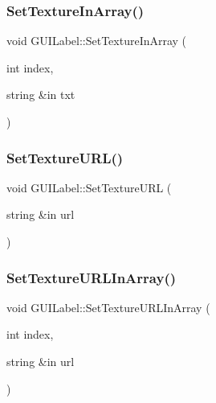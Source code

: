 \hypertarget{class_g_u_i_label_a912bd573d07f939e5a40ef0b094566be}{}\label{class_g_u_i_label_a912bd573d07f939e5a40ef0b094566be} 
\subsubsection{\texorpdfstring{Set\+Texture\+In\+Array()}{SetTextureInArray()}}
{\footnotesize\ttfamily void G\+U\+I\+Label\+::\+Set\+Texture\+In\+Array (\begin{DoxyParamCaption}\item[{int}]{index,  }\item[{string \&in}]{txt }\end{DoxyParamCaption})}

\hypertarget{class_g_u_i_label_a0ab6d355c6e465f80299d08edf98da87}{}\label{class_g_u_i_label_a0ab6d355c6e465f80299d08edf98da87} 
\subsubsection{\texorpdfstring{Set\+Texture\+U\+R\+L()}{SetTextureURL()}}
{\footnotesize\ttfamily void G\+U\+I\+Label\+::\+Set\+Texture\+U\+RL (\begin{DoxyParamCaption}\item[{string \&in}]{url }\end{DoxyParamCaption})}

\hypertarget{class_g_u_i_label_ae216a9d23cc634bdf0eed7736f26f6d2}{}\label{class_g_u_i_label_ae216a9d23cc634bdf0eed7736f26f6d2} 
\subsubsection{\texorpdfstring{Set\+Texture\+U\+R\+L\+In\+Array()}{SetTextureURLInArray()}}
{\footnotesize\ttfamily void G\+U\+I\+Label\+::\+Set\+Texture\+U\+R\+L\+In\+Array (\begin{DoxyParamCaption}\item[{int}]{index,  }\item[{string \&in}]{url }\end{DoxyParamCaption})}

